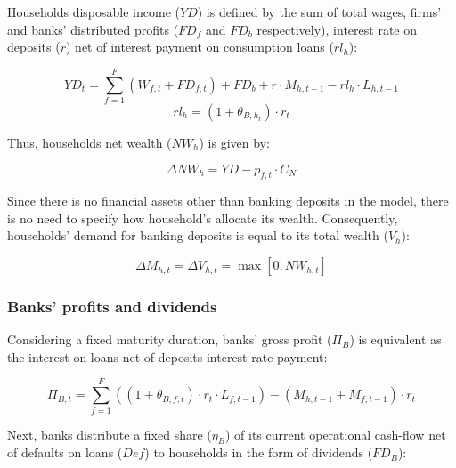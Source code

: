 \documentclass{SelfArx}
\begin{document}
Households disposable income (\(YD\)) is defined by the sum of total wages, firms' and banks' distributed profits (\(FD_{f}\) and \(FD_{b}\) respectively), interest rate on deposits (\(r\)) net of interest payment on consumption loans (\(rl_{h}\)):

\begin{latex}
\begin{equation}
YD_{t} = \sum_{f=1}^{F}\left(W_{f,t} + FD_{f,t}\right) + FD_{b} + r\cdot M_{h,t-1} - rl_{h}\cdot L_{h,t-1}
\end{equation}
\begin{equation}
rl_{h} = (1+\theta_{B,h_{t}})\cdot r_{t}
\end{equation}
\end{latex}
Thus, households net wealth (\(NW_{h}\)) is given by:
\begin{latex}
\begin{equation}
\Delta NW_{h} = YD - p_{f,t}\cdot C_{N}
\end{equation}
\end{latex}
Since there is no financial assets other than banking deposits in the model, there is no need to specify how household's allocate its wealth.
Consequently, households' demand for banking deposits is equal to its total wealth (\(V_{h}\)):

\begin{latex}
\begin{equation}
\Delta M_{h,t} = \Delta V_{h,t} = \max [0, NW_{h,t}]
\end{equation}
\end{latex}

\subsubsection{Banks' profits and dividends}
\label{sec:org36edc53}


Considering a fixed maturity duration, banks' gross profit (\(\Pi_{B}\)) is equivalent as the interest on loans net of deposits interest rate payment:

\begin{latex}
\begin{equation}
\Pi_{B,t} = \sum_{f=1}^{F} \left(\left(1+\theta_{B,f,t}\right)\cdot r_{t}\cdot L_{f,t-1}\right) - (M_{h,t-1} + M_{f,t-1})\cdot r_{t}
\end{equation}
\end{latex}
Next, banks distribute a fixed share (\(\eta_{B}\)) of its current operational cash-flow net of defaults on loans (\(Def\)) to households in the form of dividends (\(FD_{B}\)):
\end{document}
